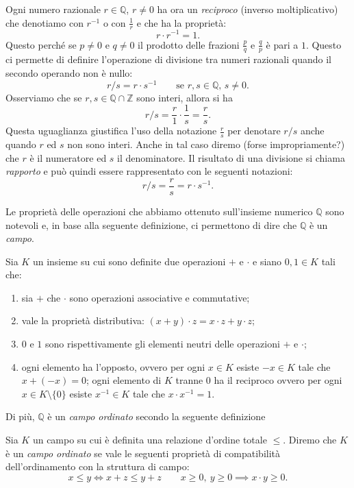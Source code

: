 \documentclass[italian,a4paper,hidelinks,headinclude]{scrartcl}
\newcommand{\ZZ}{{\mathbb Z}}
\newcommand{\QQ}{{\mathbb Q}}
\newcommand{\myemph}[1]{\emph{#1}\marginpar{#1}}
\begin{document}
Ogni numero razionale $r\in \QQ$, $r\neq 0$ ha ora un \emph{reciproco}
(inverso moltiplicativo) che denotiamo con $r^{-1}$ o con $\frac{1}{r}$
e che ha la proprietà:
\[
  r \cdot r^{-1} = 1.
\]
Questo perché se $p\neq 0$ e $q\neq 0$ il prodotto delle frazioni $\frac{p}{q}$
e $\frac q p$ è pari a $1$.
Questo ci permette di definire l'operazione di divisione tra numeri razionali
quando il secondo operando non è nullo:
\[
  r / s = r \cdot s^{-1} \qquad \text{se $r,s \in \QQ$, $s\neq 0$}.
\]
Osserviamo che se $r,s\in \QQ \cap \ZZ$ sono interi, allora si ha
\[
  r / s = \frac{r}{1} \cdot \frac{1}{s} = \frac{r}{s}.
\]
Questa uguaglianza giustifica l'uso della notazione $\frac{r}{s}$ per denotare
$r/s$ anche quando $r$ ed $s$ non sono interi. Anche in tal caso diremo
(forse impropriamente?) che $r$ è il numeratore ed $s$ il denominatore.
Il risultato di una divisione si chiama \myemph{rapporto}
e può quindi essere rappresentato con le seguenti notazioni:
\[
  r/s = \frac{r}{s} = r \cdot s^{-1}.
\]

Le proprietà delle operazioni che abbiamo ottenuto sull'insieme numerico
$\QQ$ sono notevoli e, in base alla seguente definizione, ci permettono
di dire che $\QQ$ è un \emph{campo}.

\begin{definition}[campo]
  Sia $K$ un insieme su cui sono definite due operazioni $+$ e $\cdot$
  e siano $0,1 \in K$ tali che:
  \begin{enumerate}
    \item sia $+$ che $\cdot$ sono operazioni associative e commutative;
    \item vale la proprietà distributiva: $(x+y)\cdot z = x\cdot z + y\cdot z$;
    \item $0$ e $1$ sono rispettivamente gli elementi neutri delle operazioni $+$ e $\cdot$;
    \item ogni elemento ha l'opposto, ovvero per ogni $x\in K$ esiste $-x\in K$
    tale che $x+(-x) = 0$; ogni elemento di $K$ tranne $0$ ha il reciproco
    ovvero per ogni $x\in K\setminus\{0\}$ esiste $x^{-1}\in K$ tale che
    $x\cdot x^{-1}=1$.
  \end{enumerate}
\end{definition}

Di più, $\QQ$ è un \emph{campo ordinato} secondo la seguente definizione
\begin{definition}
  Sia $K$ un campo su cui è definita una relazione d'ordine totale $\le$.
  Diremo che $K$ è un \myemph{campo ordinato} se vale le seguenti
  proprietà di compatibilità dell'ordinamento con la struttura di campo:
  \[
    x \le y \iff x+z \le y+z \qquad
    x\ge 0,\ y \ge 0 \implies x\cdot y \ge 0.
  \]
\end{definition}
\end{document}
